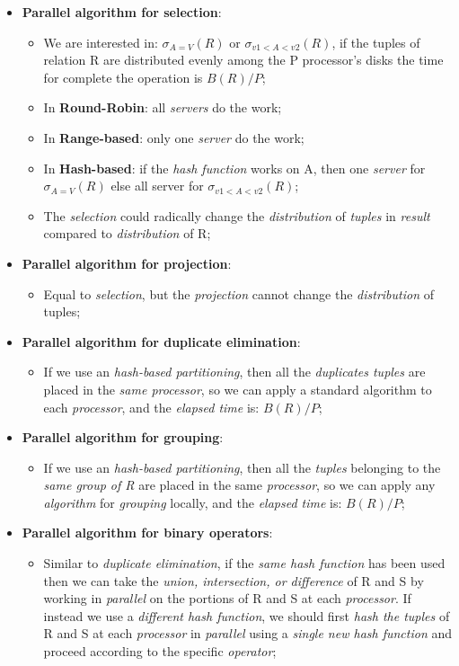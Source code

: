 \documentclass{article}
\begin{document}
\begin{itemize}
\item \textbf{Parallel algorithm for selection}:
\begin{itemize}
\item We are interested in: $\sigma_{A=V}(R) $ or $\sigma_{v1<A<v2}(R)$, if the tuples of relation R are distributed evenly among the P processor's disks the time for complete the operation is $B(R)/P$;
\item In \textbf{Round-Robin}: all \emph{servers} do the work; 
\item In \textbf{Range-based}: only one \emph{server} do the work;
\item In\textbf{ Hash-based}: if the \emph{hash function} works on A, then one \emph{server} for $\sigma_{A=V}(R) $ else all server for $\sigma_{v1<A<v2}(R)$;
\item The \emph{selection} could radically change the \emph{distribution} of \emph{tuples} in \emph{result} compared to \emph{distribution} of R;
\end{itemize}
\item \textbf{Parallel algorithm for projection}:
\begin{itemize}
\item Equal to \emph{selection}, but the \emph{projection} cannot change the \emph{distribution} of tuples;
\end{itemize}
\item \textbf{Parallel algorithm for duplicate elimination}:
\begin{itemize}
\item If we use an \emph{hash-based partitioning}, then all the \emph{duplicates tuples} are placed in the \emph{same processor}, so we can apply a standard algorithm to each \emph{processor}, and the \emph{elapsed time} is: $B(R)/P$;
\end{itemize}
\item \textbf{Parallel algorithm for grouping}:
\begin{itemize}
\item If we use an \emph{hash-based partitioning}, then all the \emph{tuples} belonging to the \emph{same group of R }are placed in the same \emph{processor}, so we can apply any \emph{algorithm} for \emph{grouping} locally, and the \emph{elapsed time} is: $B(R)/P$;
\end{itemize}
\item \textbf{Parallel algorithm for binary operators}:
\begin{itemize}
\item Similar to \emph{duplicate elimination}, if the \emph{same hash function} has been used then we can take the \emph{union, intersection, or difference} of R and S by working in \emph{parallel} on the portions of R and S at each \emph{processor}. If instead we use a \emph{different hash function}, we should first \emph{hash the tuples} of R and S at each \emph{processor} in \emph{parallel} using a \emph{single new hash function} and proceed according to the specific \emph{operator};

\end{itemize}
\end{itemize}
\end{document}
